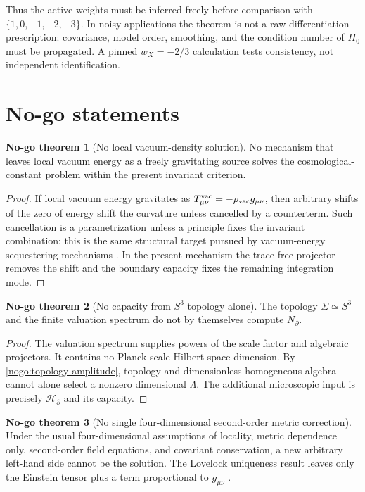 \documentclass[aps,prd,reprint,nofootinbib,superscriptaddress]{revtex4-2}
\numberwithin{equation}{section}
\theoremstyle{definition}
\newtheorem{nogotheorem}{No-go theorem}[section]
\theoremstyle{plain}
\newcommand{\Ncap}{N_{\partial}}
\begin{document}
Thus the active weights must be inferred freely before comparison with \(\{1,0,-1,-2,-3\}\).  In noisy applications the theorem is not a raw-differentiation prescription: covariance, model order, smoothing, and the condition number of \(H_0\) must be propagated.  A pinned \(w_X=-2/3\) calculation tests consistency, not independent identification.

\section{No-go statements}

\begin{nogotheorem}[No local vacuum-density solution]\label{nogo:vacuum-density}
No mechanism that leaves local vacuum energy as a freely gravitating source solves the cosmological-constant problem within the present invariant criterion.
\end{nogotheorem}

\begin{proof}
If local vacuum energy gravitates as \(T^{\rm vac}_{\mu\nu}=-\rho_{\rm vac}g_{\mu\nu}\), then arbitrary shifts of the zero of energy shift the curvature unless cancelled by a counterterm.  Such cancellation is a parametrization unless a principle fixes the invariant combination; this is the same structural target pursued by vacuum-energy sequestering mechanisms \cite{KaloperPadilla2014}.  In the present mechanism the trace-free projector removes the shift and the boundary capacity fixes the remaining integration mode.
\end{proof}

\begin{nogotheorem}[No capacity from \(S^3\) topology alone]\label{nogo:no-topology-capacity}
The topology \(\Sigma\simeq S^3\) and the finite valuation spectrum do not by themselves compute \(\Ncap\).
\end{nogotheorem}

\begin{proof}
The valuation spectrum supplies powers of the scale factor and algebraic projectors.  It contains no Planck-scale Hilbert-space dimension.  By \cref{nogo:topology-amplitude}, topology and dimensionless homogeneous algebra cannot alone select a nonzero dimensional \(\Lambda\).  The additional microscopic input is precisely \(\mathcal H_\partial\) and its capacity.
\end{proof}

\begin{nogotheorem}[No single four-dimensional second-order metric correction]\label{nogo:lovelock}
Under the usual four-dimensional assumptions of locality, metric dependence only, second-order field equations, and covariant conservation, a new arbitrary left-hand side cannot be the solution.  The Lovelock uniqueness result leaves only the Einstein tensor plus a term proportional to \(g_{\mu\nu}\) \cite{Lovelock1971,Curiel2016,PadmanabhanKothawala2013}.
\end{nogotheorem}
\end{document}
